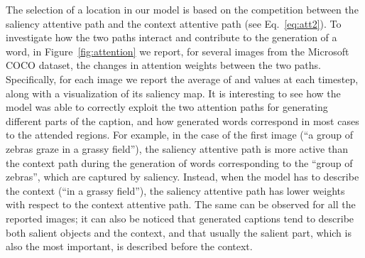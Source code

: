 The selection of a location in our model is based on the competition between the saliency attentive path and the context attentive path (see Eq.~\ref{eq:att2}). To investigate how the two paths interact and contribute to the generation of a word, in Figure~\ref{fig:attention} we report, for several images from the Microsoft COCO dataset, the changes in attention weights between the two paths. Specifically, for each image we report the average of  and  values at each timestep, along with a visualization of its saliency map. It is interesting to see how the model was able to correctly exploit the two attention paths for generating different parts of the caption, and how generated words correspond in most cases to the attended regions. For example, in the case of the first image (``a group of zebras graze in a grassy field''), the saliency attentive path is more active than the context path during the generation of words corresponding to the ``group of zebras'', which are captured by saliency. Instead, when the model has to describe the context (``in a grassy field''), the saliency attentive path has lower weights with respect to the context attentive path. The same can be observed for all the reported images; it can also be noticed that generated captions tend to describe both salient objects and the context, and that usually the salient part, which is also the most important, is described before the context.

